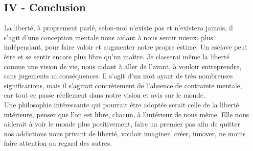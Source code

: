 \documentclass[twocolumn, french]{article}
\begin{document}
\subsection*{IV - Conclusion}
La liberté, à proprement parlé, selon-moi n'existe pas et n'existera jamais, il s'agit d'une 
conception mentale nous aidant à nous sentir mieux, plus indépendant, pour faire valoir et augmenter 
notre propre estime. Un esclave peut être et se sentir encore plus libre qu'un maître. Je classerai
même la liberté comme une vision de vie, nous aidant à aller de l'avant, à vouloir entreprendre,
sans jugements ni conséquences. Il s'agit d'un mot ayant de très nombreuses significations, mais
il s'agirait concrètement de l'absence de contrainte mentale, car tout ce passe réellement dans 
notre vision et avis sur le monde. \\ Une philosophie intéressante qui pourrait être adoptée 
serait celle de la liberté intérieure, penser que l'on est libre, chacun, à l'intérieur de nous 
même. Elle nous aiderait à voir le monde plus positivement, faire un premier pas afin de quitter
nos addictions nous privant de liberté, vouloir imaginer, créer, innover, ne moins faire attention
au regard des autres.
\end{document}
